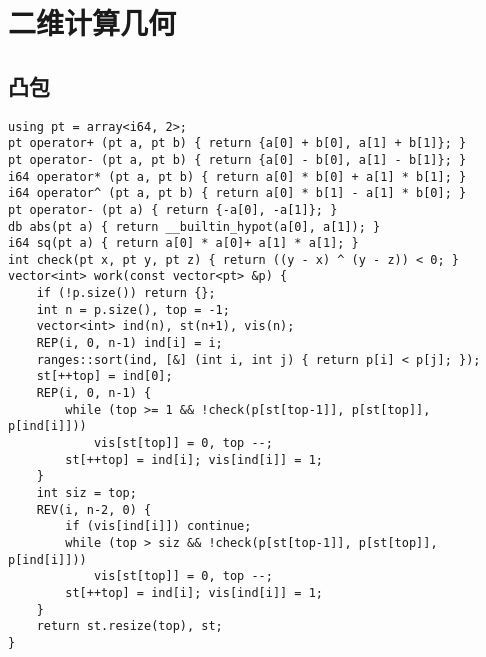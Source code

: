 \documentclass[a4paper,landscape,twocolumn]{ctexart}
\begin{document}
\section{二维计算几何}

\subsection{凸包}

\begin{lstlisting}
using pt = array<i64, 2>;
pt operator+ (pt a, pt b) { return {a[0] + b[0], a[1] + b[1]}; }
pt operator- (pt a, pt b) { return {a[0] - b[0], a[1] - b[1]}; }
i64 operator* (pt a, pt b) { return a[0] * b[0] + a[1] * b[1]; }
i64 operator^ (pt a, pt b) { return a[0] * b[1] - a[1] * b[0]; }
pt operator- (pt a) { return {-a[0], -a[1]}; }
db abs(pt a) { return __builtin_hypot(a[0], a[1]); }
i64 sq(pt a) { return a[0] * a[0]+ a[1] * a[1]; }
int check(pt x, pt y, pt z) { return ((y - x) ^ (y - z)) < 0; }
vector<int> work(const vector<pt> &p) {
	if (!p.size()) return {};
	int n = p.size(), top = -1;
	vector<int> ind(n), st(n+1), vis(n);
	REP(i, 0, n-1) ind[i] = i;
	ranges::sort(ind, [&] (int i, int j) { return p[i] < p[j]; });
	st[++top] = ind[0];
	REP(i, 0, n-1) {
		while (top >= 1 && !check(p[st[top-1]], p[st[top]], p[ind[i]]))
			vis[st[top]] = 0, top --;
		st[++top] = ind[i]; vis[ind[i]] = 1;
	}
	int siz = top;
	REV(i, n-2, 0) {
		if (vis[ind[i]]) continue;
		while (top > siz && !check(p[st[top-1]], p[st[top]], p[ind[i]]))
			vis[st[top]] = 0, top --;
		st[++top] = ind[i]; vis[ind[i]] = 1;
	}
	return st.resize(top), st;
}
\end{lstlisting}

%
%
\end{document}
